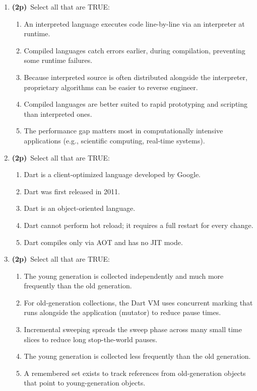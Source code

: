 \documentclass[11pt]{article}
\newcommand{\pts}{\textbf{(2p)}~}
\begin{document}
\begin{enumerate}
    \item \pts Select all that are TRUE:
    \begin{enumerate}
      \item An interpreted language executes code line-by-line via an interpreter at runtime.
      \item Compiled languages catch errors earlier, during compilation, preventing some runtime failures.
      \item Because interpreted source is often distributed alongside the interpreter, proprietary algorithms can be easier to reverse engineer.
      \item Compiled languages are better suited to rapid prototyping and scripting than interpreted ones.
      \item The performance gap matters most in computationally intensive applications (e.g., scientific computing, real-time systems).
    \end{enumerate}

    \item \pts Select all that are TRUE:
    \begin{enumerate}
      \item Dart is a client-optimized language developed by Google.
      \item Dart was first released in 2011.
      \item Dart is an object-oriented language.
      \item Dart cannot perform hot reload; it requires a full restart for every change.
      \item Dart compiles only via AOT and has no JIT mode.
    \end{enumerate}

    \item \pts Select all that are TRUE:
    \begin{enumerate}
      \item The young generation is collected independently and much more frequently than the old generation.
      \item For old-generation collections, the Dart VM uses concurrent marking that runs alongside the application (mutator) to reduce pause times.
      \item Incremental sweeping spreads the sweep phase across many small time slices to reduce long stop-the-world pauses.
      \item The young generation is collected less frequently than the old generation.
      \item A remembered set exists to track references from old-generation objects that point to young-generation objects.
    \end{enumerate}


\end{enumerate}
\end{document}
